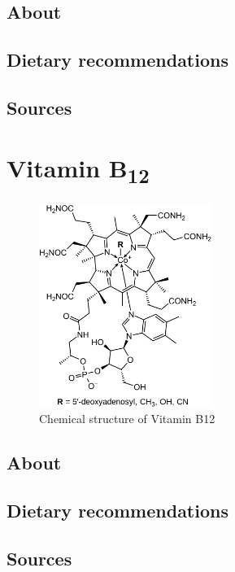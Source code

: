 \documentclass{book}
\begin{document}
\section{About}


\section{Dietary recommendations}


\section{Sources}


\chapter{Vitamin B\textsubscript{12}}
\begin{figure}[h]
	\caption{Chemical structure of Vitamin B12}
	\centering \includegraphics[width=0.5\textwidth]{images/Vitamin_B12_chemical_structure}
\end{figure}
\newpage

\section{About}


\section{Dietary recommendations}


\section{Sources}
\end{document}
